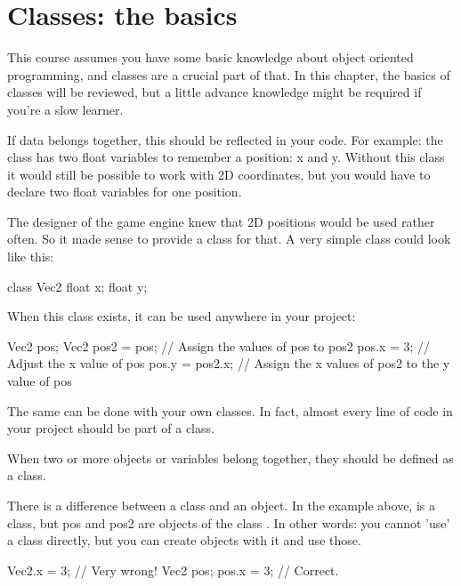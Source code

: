 \chapter{Classes: the basics}

This course assumes you have some basic knowledge about object oriented programming, and classes are a crucial part of that. In this chapter, the basics of classes will be reviewed, but a little advance knowledge might be required if you're a slow learner.

If data belongs together, this should be reflected in your code. For example: the class  has two float variables to remember a position: x and y. Without this class it would still be possible to work with 2D coordinates, but you would have to declare two float variables for one position. 

The designer of the game engine knew that 2D positions would be used rather often. So it made sense to provide a class for that. A very simple  class could look like this:

\begin{code}
class Vec2 {
	float x;
	float y;
}  
\end{code}

When this class exists, it can be used anywhere in your project:

\begin{code}
Vec2 pos;
Vec2 pos2 = pos; // Assign the values of pos to pos2
pos.x = 3;       // Adjust the x value of pos
pos.y = pos2.x;  // Assign the x values of pos2 to the y value of pos
\end{code}

The same can be done with your own classes. In fact, almost every line of code in your project should be part of a class.

\begin{note}
When two or more objects or variables belong together, they should be defined as a class.
\end{note}

There is a difference between a class and an object. In the example above,  is a class, but pos and pos2 are objects of the class . In other words: you cannot 'use' a class directly, but you can create objects with it and use those.

\begin{code}
Vec2.x = 3; // Very wrong!
Vec2 pos;
pos.x = 3; // Correct.
\end{code}

